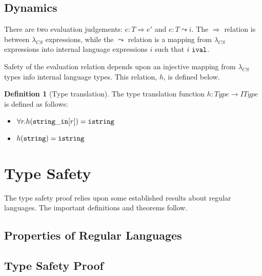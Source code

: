 \documentclass[10pt,preprint]{sigplanconf}
\theoremstyle{definition}
\newtheorem{defn}[thm]{Definition}
\newcommand{\strin}[1]{{\tt string\_in #1}}
\newcommand{\str}{ {\tt string} }
\newcommand{\istr}{ {\tt istring} }
\newcommand{\reduces}{ \Rightarrow }
\newcommand{\ireduces}{ \leadsto }
\newcommand{\ival}{ \ {\tt ival} }
\newcommand{\lcs}{\lambda_{CS}}
\begin{document}
\subsection{Dynamics}

There are two evaluation judgements: $e:T \reduces e'$ and $e:T \ireduces i$.
The $\reduces$ relation is between $\lcs$ expressions, while the $\ireduces$
relation is a mapping from $\lcs$ expressions into internal language expressions
$i$ such that $i \ival$.

Safety of the evaluation relation depends upon an injective mapping from $\lcs$ types info
internal language types. This relation, $h$, is defined below.

\begin{defn}[Type translation]
  The type translation function $h : Type \rightarrow IType$ is defined as follows:
  \begin{itemize}
    \item $\forall r. h(\strin[r]) = \istr$
    \item $h(\str) = \istr$
  \end{itemize}
\end{defn}

\section{Type Safety}

The type safety proof relies upon some established results about regular languages.
The important definitions and theorems follow.

\subsection{Properties of Regular Languages}

\subsection{Type Safety Proof}
\end{document}
